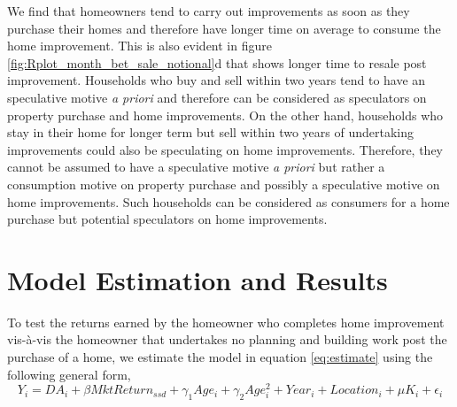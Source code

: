 \documentclass[AEJ,reqno, draftmode]{AEA} %
\begin{document}
We find that homeowners tend to carry out improvements as soon as they purchase their homes and therefore have longer time on average to consume the home improvement. This is also evident in figure \ref{fig:Rplot_month_bet_sale_notional}d that shows longer time to resale post improvement. Households who buy and sell within two years tend to have an speculative motive \textit{a priori} and therefore can be considered as speculators on property purchase and home improvements. On the other hand, households who stay in their home for longer term but sell within two years of undertaking improvements could also be speculating on home improvements. Therefore, they cannot be assumed to have a speculative motive \textit{a priori} but rather a consumption motive on property purchase and possibly a speculative motive on home improvements. Such households can be considered as consumers for a home purchase but potential speculators on home improvements.






\section{Model Estimation and Results}


To test the returns earned by the homeowner who completes home improvement vis-à-vis the homeowner that undertakes no planning and building work post the purchase of a home, we estimate the model in equation \ref{eq:estimate} using the following general form,
\begin{equation} \label{eq: main_equation}
    Y_i = DA_i + \beta{MktReturn_{ssd}} + \gamma_1{Age_i} + \gamma_2{Age_i^2} + Year_i + Location_i + \mu{K_i} + \epsilon_i
\end{equation}
\end{document}
